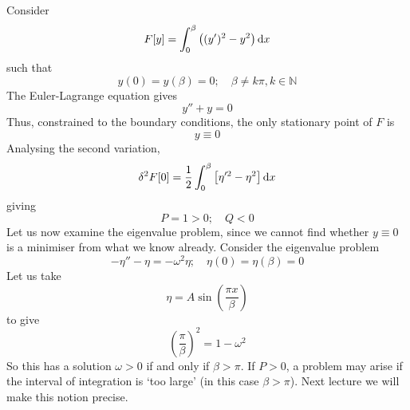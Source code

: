 \begin{example}
	Consider
	\[
		F[y] = \int_0^\beta \qty((y')^2 - y^2)\dd{x}
	\]
	such that
	\[
		y(0) = y(\beta) = 0;\quad \beta \neq k\pi, k \in \mathbb N
	\]
	The Euler-Lagrange equation gives
	\[
		y'' + y = 0
	\]
	Thus, constrained to the boundary conditions, the only stationary point of \( F \) is
	\[
		y \equiv 0
	\]
	Analysing the second variation,
	\[
		\delta^2 F[0] = \frac{1}{2} \int_0^\beta \qty[\eta'^2 - \eta^2] \dd{x}
	\]
	giving
	\[
		P = 1 > 0;\quad Q < 0
	\]
	Let us now examine the eigenvalue problem, since we cannot find whether \( y \equiv 0 \) is a minimiser from what we know already.
	Consider the eigenvalue problem
	\[
		-\eta'' - \eta = -\omega^2 \eta;\quad \eta(0) = \eta(\beta) = 0
	\]
	Let us take
	\[
		\eta = A \sin(\frac{\pi x}{\beta})
	\]
	to give
	\[
		(\frac{\pi}{\beta})^2 = 1 - \omega^2
	\]
	So this has a solution \( \omega > 0 \) if and only if \( \beta > \pi \).
	If \( P > 0 \), a problem may arise if the interval of integration is `too large' (in this case \( \beta > \pi \)).
	Next lecture we will make this notion precise.
\end{example}

